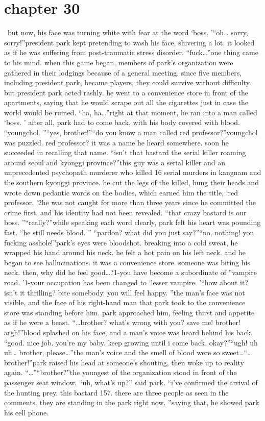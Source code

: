 \section{chapter 30}






 but now, his face was turning white with fear at the word ‘boss.
’“oh… sorry, sorry!”president park kept pretending to wash his face, shivering a lot.
 it looked as if he was suffering from post-traumatic stress disorder.
“fuck…”one thing came to his mind.
when this game began, members of park’s organization were gathered in their lodgings because of a general meeting.
 since five members, including president park, became players, they could survive without difficulty.
but president park acted rashly.
 he went to a convenience store in front of the apartments, saying that he would scrape out all the cigarettes just in case the world would be ruined.
“ha, ha…”right at that moment, he ran into a man called ‘boss.
’ after all, park had to come back, with his body covered with blood.
“youngchol.
”“yes, brother!”“do you know a man called red professor?”youngchol was puzzled.
 red professor? it was a name he heard somewhere.
soon he succeeded in recalling that name.
“isn’t that bastard the serial killer roaming around seoul and kyonggi province?”this guy was a serial killer and an unprecedented psychopath murderer who killed 16 serial murders in kangnam and the southern kyonggi province.
 he cut the legs of the killed, hung their heads and wrote down pedantic words on the bodies, which earned him the title, ‘red professor.
’2he was not caught for more than three years since he committed the crime first, and his identity had not been revealed.
“that crazy bastard is our boss.
”“really?”while speaking each word clearly, park felt his heart was pounding fast.
“he still needs blood.
”
“pardon? what did you just say?”“no, nothing! you fucking asshole!”park’s eyes were bloodshot.
 breaking into a cold sweat, he wrapped his hand around his neck.
he felt a hot pain on his left neck.
 and he began to see hallucinations.
 it was a convenience store.
 someone was biting his neck.
 then, why did he feel good…?1-you have become a subordinate of ”vampire road.
’1-your occupation has been changed to ‘lesser vampire.
’“how about it? isn’t it thrilling? bite somebody.
 you will feel happy.
”the man’s face was not visible, and the face of his right-hand man that park took to the convenience store was standing before him.
park approached him, feeling thirst and appetite as if he were a beast.
“…brother? what’s wrong with you? save me! brother! argh!”blood splashed on his face, and a man’s voice was heard behind his back.
“good.
 nice job.
 you’re my baby.
 keep growing until i come back.
 okay?”“ugh! uh uh… brother, please…”the man’s voice and the smell of blood were so sweet…“…brother!”park raised his head at someone’s shouting, then woke up to reality again.
“…”“brother?”the youngest of the organization stood in front of the passenger seat window.
“uh, what’s up?” said park.
“i’ve confirmed the arrival of the hunting prey.
 this bastard 157.
 there are three people as seen in the comments.
 they are standing in the park right now.
”saying that, he showed park his cell phone.


